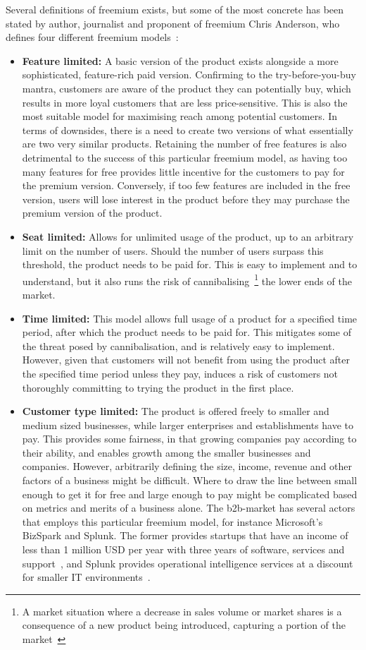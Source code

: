 Several definitions of freemium exists, but some of the most concrete has been stated by author, journalist and proponent of freemium Chris Anderson, who defines four different freemium models~\cite{chrisanderson2012}:

\begin{itemize}
    \item \textbf{Feature limited: }A basic version of the product exists alongside a more sophisticated, feature-rich paid version. Confirming to the try-before-you-buy mantra, customers are aware of the product they can potentially buy, which results in more loyal customers that are less price-sensitive. This is also the most suitable model for maximising reach among potential customers. In terms of downsides, there is a need to create two versions of what essentially are two very similar products. Retaining the number of free features is also detrimental to the success of this particular freemium model, as having too many features for free provides little incentive for the customers to pay for the premium version. Conversely, if too few features are included in the free version, users will lose interest in the product before they may purchase the premium version of the product.
    \item \textbf{Seat limited: }Allows for unlimited usage of the product, up to an arbitrary limit on the number of users. Should the number of users surpass this threshold, the product needs to be paid for. This is easy to implement and to understand, but it also runs the risk of cannibalising~\footnote{A market situation where a decrease in sales volume or market shares is a consequence of a new product being introduced, capturing a portion of the market~\cite{lifeofentrepeneur2015}} the lower ends of the market.
    \item \textbf{Time limited: }This model allows full usage of a product for a specified time period, after which the product needs to be paid for. This mitigates some of the threat posed by cannibalisation, and is relatively easy to implement. However, given that customers will not benefit from using the product after the specified time period unless they pay, induces a risk of customers not thoroughly committing to trying the product in the first place.
    \item \textbf{Customer type limited: }The product is offered freely to smaller and medium sized businesses, while larger enterprises and establishments have to pay. This provides some fairness, in that growing companies pay according to their ability, and enables growth among the smaller businesses and companies. However, arbitrarily defining the size, income, revenue and other factors of a business might be difficult. Where to draw the line between small enough to get it for free and large enough to pay might be complicated based on metrics and merits of a business alone. The \gls{b2b}-market has several actors that employs this particular freemium model, for instance Microsoft's BizSpark and Splunk. The former provides startups that have an income of less than 1 million USD per year with three years of software, services and support~\cite{microsoft2016}, and Splunk provides operational intelligence services at a discount for smaller IT environments~\cite{splunk2016}.

\end{itemize}
